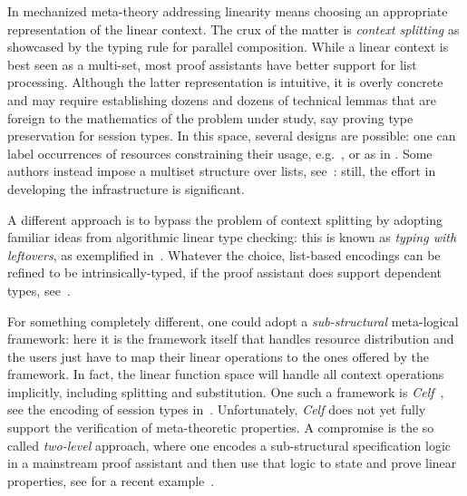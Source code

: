 
In mechanized meta-theory addressing linearity means choosing an
appropriate representation of the linear context. The crux of the matter
is \emph{context splitting} as showcased by the typing rule for parallel composition.
While a linear context is best seen as a multi-set, most proof
assistants have better support for list processing.  Although the
latter representation is intuitive, it is overly concrete and may
require establishing dozens and dozens of technical lemmas that are
foreign to the mathematics of the problem under study, say proving
type preservation for session types. In this space, several designs
are possible: one can label occurrences of resources constraining
their usage, e.g.~\cite{CicconeP20}, or  as in \cite{Castro2020}. Some authors instead impose a
multiset structure over lists, see~\cite{ChaudhuriLR19,Danielsson12}:
still, the effort in developing the infrastructure is significant.

A different approach is to bypass the problem of context splitting by
adopting
familiar ideas from algorithmic linear type checking: this is known as
 \emph{typing with leftovers}, as exemplified
in~\cite{DBLP:conf/forte/ZalakainD21}. Whatever the choice, list-based
encodings can be refined to be intrinsically-typed, if the proof
assistant does support dependent types, see~\cite{Thiemann2019,CicconeP20,RouvoetPKV20}.

For something completely different, one could adopt a
\emph{sub-structural} meta-logical framework: here it is the framework
itself that handles resource distribution and the users just have to map
their linear operations to the ones offered by the framework. In fact,
the linear function space will handle all context operations
implicitly, including splitting and substitution. One such a framework
is \emph{Celf}~\cite{Schack-Nielsen:IJCAR08}, see the encoding of
session types in~\cite{Bock2016}. Unfortunately, \emph{Celf} does not
yet fully support the verification of meta-theoretic properties. A compromise is the so called
\emph{two-level} approach, where one encodes a sub-structural
specification logic in a mainstream proof assistant and then use that
logic to state and prove linear properties, see for a recent
example~\cite{Felty:MSCS21}.




